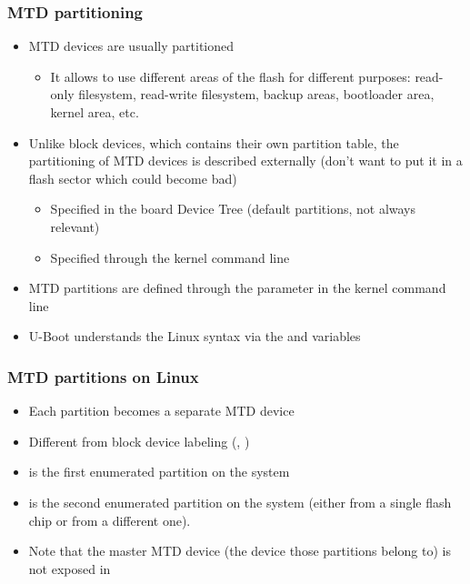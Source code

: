 \begin{frame}
  \frametitle{MTD partitioning}
  \begin{itemize}
  \item MTD devices are usually partitioned
    \begin{itemize}
    \item It allows to use different areas of the flash for different
      purposes: read-only filesystem, read-write filesystem, backup
      areas, bootloader area, kernel area, etc.
    \end{itemize}
  \item Unlike block devices, which contains their own partition
    table, the partitioning of MTD devices is described externally
    (don't want to put it in a flash sector which could become bad)
    \begin{itemize}
    \item Specified in the board Device Tree (default partitions, not always relevant)
    \item Specified through the kernel command line
    \end{itemize}
  \item MTD partitions are defined through the  parameter in
    the kernel command line
  \item U-Boot understands the Linux syntax via the  and
     variables
  \end{itemize}
\end{frame}

\begin{frame}
  \frametitle{MTD partitions on Linux}
  \begin{itemize}
  \item Each partition becomes a separate MTD device
  \item Different from block device labeling (,
    )
  \item {} is the first enumerated partition on the system
  \item {} is the second enumerated partition on the system
    (either from a single flash chip or from a different one).
  \item Note that the master MTD device (the device those partitions
    belong to) is not exposed in 
  \end{itemize}
\end{frame}

